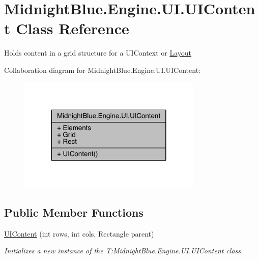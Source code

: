 \hypertarget{class_midnight_blue_1_1_engine_1_1_u_i_1_1_u_i_content}{}\section{Midnight\+Blue.\+Engine.\+U\+I.\+U\+I\+Content Class Reference}
\label{class_midnight_blue_1_1_engine_1_1_u_i_1_1_u_i_content}


Holds content in a grid structure for a U\+I\+Context or \hyperlink{class_midnight_blue_1_1_engine_1_1_u_i_1_1_layout}{Layout}  




Collaboration diagram for Midnight\+Blue.\+Engine.\+U\+I.\+U\+I\+Content\+:
\nopagebreak
\begin{figure}[H]
\begin{center}
\leavevmode
\includegraphics[width=248pt]{class_midnight_blue_1_1_engine_1_1_u_i_1_1_u_i_content__coll__graph}
\end{center}
\end{figure}
\subsection*{Public Member Functions}
\begin{DoxyCompactItemize}
\item 
\hyperlink{class_midnight_blue_1_1_engine_1_1_u_i_1_1_u_i_content_a380a742b33c7fca4877071e8d7fef849}{U\+I\+Content} (int rows, int cols, Rectangle parent)
\begin{DoxyCompactList}\small\item\em Initializes a new instance of the T\+:\+Midnight\+Blue.\+Engine.\+U\+I.\+U\+I\+Content class. \end{DoxyCompactList}\end{DoxyCompactItemize}
